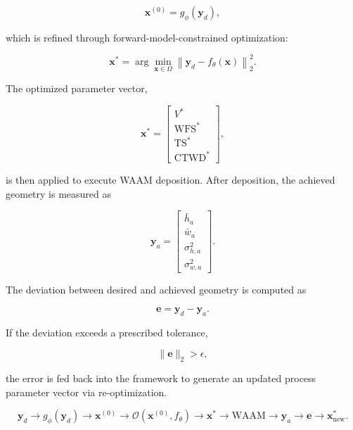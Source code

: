 \documentclass[11pt]{article}
\begin{document}
\begin{equation}
\mathbf{x}^{(0)} = g_{\phi}(\mathbf{y}_{d}),
\end{equation}

which is refined through forward-model-constrained optimization:

\begin{equation}
\mathbf{x}^{*} =
\arg\min_{\mathbf{x}\in\Omega}
\left\|
\mathbf{y}_{d} - f_{\theta}(\mathbf{x})
\right\|_{2}^{2}.
\end{equation}

The optimized parameter vector,

\begin{equation}
\mathbf{x}^{*} =
\begin{bmatrix}
V^{*} \\
\mathrm{WFS}^{*} \\
\mathrm{TS}^{*} \\
\mathrm{CTWD}^{*}
\end{bmatrix},
\end{equation}

is then applied to execute WAAM deposition. After deposition, the achieved geometry is measured as

\begin{equation}
\mathbf{y}_{a} =
\begin{bmatrix}
\bar{h}_{a} \\
\bar{w}_{a} \\
\sigma_{h,a}^{2} \\
\sigma_{w,a}^{2}
\end{bmatrix}.
\end{equation}

The deviation between desired and achieved geometry is computed as

\begin{equation}
\mathbf{e} = \mathbf{y}_{d} - \mathbf{y}_{a}.
\end{equation}

If the deviation exceeds a prescribed tolerance,

\begin{equation}
\|\mathbf{e}\|_{2} > \epsilon,
\end{equation}

the error is fed back into the framework to generate an updated process parameter vector via re-optimization.

\begin{tcolorbox}[colback=white,colframe=black,boxrule=0.5pt,arc=2pt]
\small
\begin{equation}
\mathbf{y}_{d}
\rightarrow
g_{\phi}(\mathbf{y}_{d})
\rightarrow
\mathbf{x}^{(0)}
\rightarrow
\mathcal{O}(\mathbf{x}^{(0)}, f_{\theta})
\rightarrow
\mathbf{x}^{*}
\rightarrow
\mathrm{WAAM}
\rightarrow
\mathbf{y}_{a}
\rightarrow
\mathbf{e}
\rightarrow
\mathbf{x}_{\mathrm{new}}^{*}.
\end{equation}
\end{tcolorbox}
\end{document}
